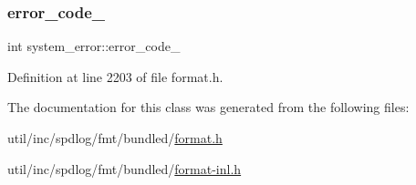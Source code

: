 \subsubsection{\texorpdfstring{error\+\_\+code\+\_\+}{error\_code\_}}
{\footnotesize\ttfamily int system\+\_\+error\+::error\+\_\+code\+\_\+\hspace{0.3cm}{\ttfamily [protected]}}



Definition at line 2203 of file format.\+h.



The documentation for this class was generated from the following files\+:\begin{DoxyCompactItemize}
\item 
util/inc/spdlog/fmt/bundled/\hyperlink{format_8h}{format.\+h}\item 
util/inc/spdlog/fmt/bundled/\hyperlink{format-inl_8h}{format-\/inl.\+h}\end{DoxyCompactItemize}
